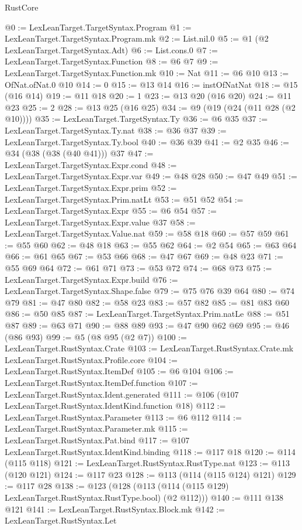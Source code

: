 \begin{lexlean}{RustCore}
\begin{coremodule}
@0 := LexLeanTarget.TargetSyntax.Program
@1 := LexLeanTarget.TargetSyntax.Program.mk
@2 := List.nil.{0}
@5 := @1 (@2 LexLeanTarget.TargetSyntax.Adt)
@6 := List.cons.{0}
@7 := LexLeanTarget.TargetSyntax.Function
@8 := @6 @7
@9 := LexLeanTarget.TargetSyntax.Function.mk
@10 := Nat
@11 := @6 @10
@13 := OfNat.ofNat.{0} @10
@14 := 0
@15 := @13 @14
@16 := instOfNatNat
@18 := @15 (@16 @14)
@19 := @11 @18
@20 := 1
@23 := @13 @20 (@16 @20)
@24 := @11 @23
@25 := 2
@28 := @13 @25 (@16 @25)
@34 := @9 (@19 (@24 (@11 @28 (@2 @10))))
@35 := LexLeanTarget.TargetSyntax.Ty
@36 := @6 @35
@37 := LexLeanTarget.TargetSyntax.Ty.nat
@38 := @36 @37
@39 := LexLeanTarget.TargetSyntax.Ty.bool
@40 := @36 @39
@41 := @2 @35
@46 := @34 (@38 (@38 (@40 @41))) @37
@47 := LexLeanTarget.TargetSyntax.Expr.cond
@48 := LexLeanTarget.TargetSyntax.Expr.var
@49 := @48 @28
@50 := @47 @49
@51 := LexLeanTarget.TargetSyntax.Expr.prim
@52 := LexLeanTarget.TargetSyntax.Prim.natLt
@53 := @51 @52
@54 := LexLeanTarget.TargetSyntax.Expr
@55 := @6 @54
@57 := LexLeanTarget.TargetSyntax.Expr.value @37
@58 := LexLeanTarget.TargetSyntax.Value.nat
@59 := @58 @18
@60 := @57 @59
@61 := @55 @60
@62 := @48 @18
@63 := @55 @62
@64 := @2 @54
@65 := @63 @64
@66 := @61 @65
@67 := @53 @66
@68 := @47 @67
@69 := @48 @23
@71 := @55 @69 @64
@72 := @61 @71
@73 := @53 @72
@74 := @68 @73
@75 := LexLeanTarget.TargetSyntax.Expr.build
@76 := LexLeanTarget.TargetSyntax.Shape.false
@79 := @75 @76 @39 @64
@80 := @74 @79
@81 := @47 @80
@82 := @58 @23
@83 := @57 @82
@85 := @81 @83 @60
@86 := @50 @85
@87 := LexLeanTarget.TargetSyntax.Prim.natLe
@88 := @51 @87
@89 := @63 @71
@90 := @88 @89
@93 := @47 @90 @62 @69
@95 := @46 (@86 @93)
@99 := @5 (@8 @95 (@2 @7))
@100 := LexLeanTarget.RustSyntax.Crate
@103 := LexLeanTarget.RustSyntax.Crate.mk LexLeanTarget.RustSyntax.Profile.core
@104 := LexLeanTarget.RustSyntax.ItemDef
@105 := @6 @104
@106 := LexLeanTarget.RustSyntax.ItemDef.function
@107 := LexLeanTarget.RustSyntax.Ident.generated
@111 := @106 (@107 LexLeanTarget.RustSyntax.IdentKind.function @18)
@112 := LexLeanTarget.RustSyntax.Parameter
@113 := @6 @112
@114 := LexLeanTarget.RustSyntax.Parameter.mk
@115 := LexLeanTarget.RustSyntax.Pat.bind
@117 := @107 LexLeanTarget.RustSyntax.IdentKind.binding
@118 := @117 @18
@120 := @114 (@115 @118)
@121 := LexLeanTarget.RustSyntax.RustType.nat
@123 := @113 (@120 @121)
@124 := @117 @23
@128 := @113 (@114 (@115 @124) @121)
@129 := @117 @28
@138 := @123 (@128 (@113 (@114 (@115 @129) LexLeanTarget.RustSyntax.RustType.bool) (@2 @112)))
@140 := @111 @138 @121
@141 := LexLeanTarget.RustSyntax.Block.mk
@142 := LexLeanTarget.RustSyntax.Let

\end{coremodule}
\end{lexlean}
